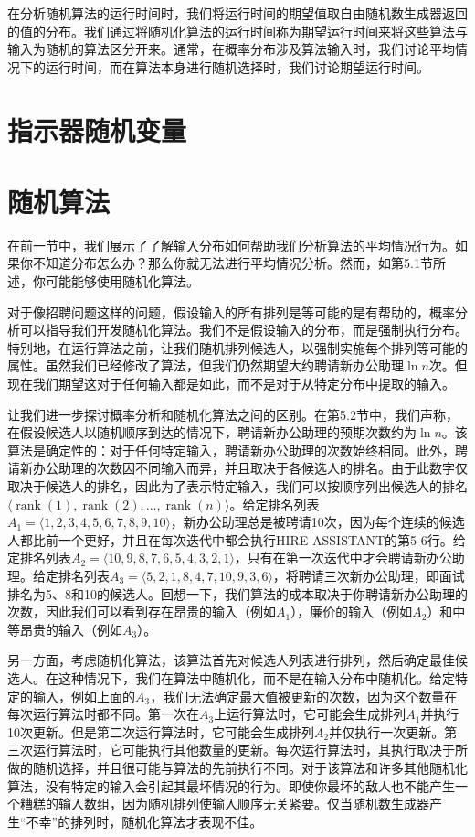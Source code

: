 \documentclass[lang=cn,newtx,10pt,scheme=chinese]{elegantbook}
\begin{document}
在分析随机算法的运行时间时，我们将运行时间的期望值取自由随机数生成器返回的值的分布。我们通过将随机化算法的运行时间称为期望运行时间来将这些算法与输入为随机的算法区分开来。通常，在概率分布涉及算法输入时，我们讨论平均情况下的运行时间，而在算法本身进行随机选择时，我们讨论期望运行时间。

\section{指示器随机变量}

\section{随机算法}

在前一节中，我们展示了了解输入分布如何帮助我们分析算法的平均情况行为。如果你不知道分布怎么办？那么你就无法进行平均情况分析。然而，如第5.1节所述，你可能能够使用随机化算法。

对于像招聘问题这样的问题，假设输入的所有排列是等可能的是有帮助的，概率分析可以指导我们开发随机化算法。我们不是假设输入的分布，而是强制执行分布。特别地，在运行算法之前，让我们随机排列候选人，以强制实施每个排列等可能的属性。虽然我们已经修改了算法，但我们仍然期望大约聘请新办公助理$\ln n$次。但现在我们期望这对于任何输入都是如此，而不是对于从特定分布中提取的输入。

让我们进一步探讨概率分析和随机化算法之间的区别。在第5.2节中，我们声称，在假设候选人以随机顺序到达的情况下，聘请新办公助理的预期次数约为$\ln n$。该算法是确定性的：对于任何特定输入，聘请新办公助理的次数始终相同。此外，聘请新办公助理的次数因不同输入而异，并且取决于各候选人的排名。由于此数字仅取决于候选人的排名，因此为了表示特定输入，我们可以按顺序列出候选人的排名$\langle\operatorname{rank}(1),\operatorname{rank}(2),\ldots,\operatorname{rank}(n)\rangle$。给定排名列表$A_1=\langle 1,2,3,4,5,6,7,8,9,10\rangle$，新办公助理总是被聘请10次，因为每个连续的候选人都比前一个更好，并且在每次迭代中都会执行HIRE-ASSISTANT的第5-6行。给定排名列表$A_2=\langle 10,9,8,7,6,5,4,3,2,1\rangle$，只有在第一次迭代中才会聘请新办公助理。给定排名列表$A_3=\langle 5,2,1,8,4,7,10,9,3,6\rangle$，将聘请三次新办公助理，即面试排名为5、8和10的候选人。回想一下，我们算法的成本取决于你聘请新办公助理的次数，因此我们可以看到存在昂贵的输入（例如$A_1$），廉价的输入（例如$A_2$）和中等昂贵的输入（例如$A_3$）。

另一方面，考虑随机化算法，该算法首先对候选人列表进行排列，然后确定最佳候选人。在这种情况下，我们在算法中随机化，而不是在输入分布中随机化。给定特定的输入，例如上面的$A_3$，我们无法确定最大值被更新的次数，因为这个数量在每次运行算法时都不同。第一次在$A_3$上运行算法时，它可能会生成排列$A_1$并执行10次更新。但是第二次运行算法时，它可能会生成排列$A_2$并仅执行一次更新。第三次运行算法时，它可能执行其他数量的更新。每次运行算法时，其执行取决于所做的随机选择，并且很可能与算法的先前执行不同。对于该算法和许多其他随机化算法，没有特定的输入会引起其最坏情况的行为。即使你最坏的敌人也不能产生一个糟糕的输入数组，因为随机排列使输入顺序无关紧要。仅当随机数生成器产生“不幸”的排列时，随机化算法才表现不佳。
\end{document}
